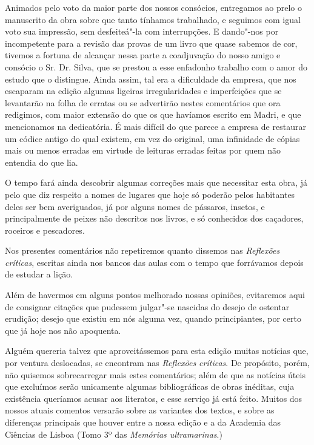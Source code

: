 Animados pelo voto da maior parte dos nossos consócios, 
entregamos ao prelo o manuscrito da obra sobre que tanto tínhamos 
trabalhado, e seguimos com igual voto sua impressão, sem desfeiteá"-la 
com interrupções. E dando"-nos por incompetente para a revisão das 
provas de um livro que quase sabemos de cor, tivemos a fortuna de 
alcançar nessa parte a coadjuvação do nosso amigo e consócio o Sr. Dr. 
Silva, que se prestou a esse enfadonho trabalho com o amor do estudo 
que o distingue. Ainda assim, tal era a dificuldade da empresa, que nos 
escaparam na edição algumas ligeiras irregularidades e imperfeições que 
se levantarão na folha de erratas ou se advertirão nestes comentários que 
ora redigimos, com maior extensão do que os que havíamos escrito em 
Madri, e que mencionamos na dedicatória. É mais difícil do que parece a 
empresa de restaurar um códice antigo do qual existem, em vez do 
original, uma infinidade de cópias mais ou menos erradas em virtude de 
leituras erradas feitas por quem não entendia do que lia.

O tempo fará ainda descobrir algumas correções mais que 
necessitar esta obra, já pelo que diz respeito a nomes de lugares que hoje 
só poderão pelos habitantes deles ser bem averiguados, já por 
alguns nomes de pássaros, insetos, e principalmente de peixes não 
descritos nos livros, e só conhecidos dos caçadores, roceiros e 
pescadores.

Nos presentes comentários não repetiremos quanto dissemos nas  \textit{Reflexões críticas}, 
escritas ainda nos bancos das aulas com o tempo que 
forrávamos depois de estudar a lição.

Além de havermos em alguns pontos melhorado nossas opiniões, 
evitaremos aqui de consignar citações que pudessem julgar"-se nascidas 
do desejo de ostentar erudição; desejo que existiu em nós alguma vez, 
quando principiantes, por certo que já hoje nos não apoquenta.

Alguém quereria talvez que aproveitássemos para esta edição 
muitas notícias que, por ventura deslocadas, se encontram nas \textit{Reflexões críticas}. 
De propósito, porém, não quisemos sobrecarregar mais estes 
comentários; além de que as notícias úteis que excluímos serão 
unicamente algumas bibliográficas de obras inéditas, cuja existência 
queríamos acusar aos literatos, e esse serviço já está feito. Muitos dos 
nossos atuais comentos versarão sobre as variantes dos textos, e sobre as 
diferenças principais que houver entre a nossa edição e a da Academia 
das Ciências de Lisboa (Tomo 3º das \textit{Memórias ultramarinas}.)

